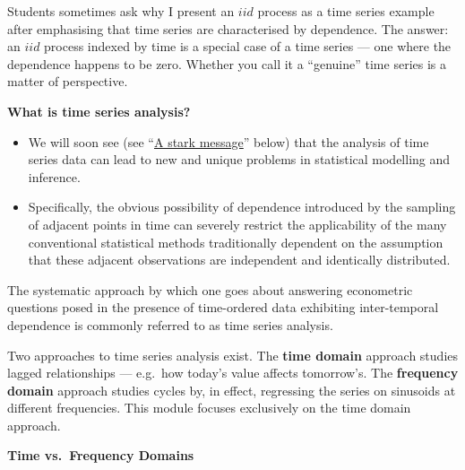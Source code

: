 \documentclass[
  letterpaper,
  DIV=11,
  numbers=noendperiod]{scrartcl}
\newcommand{\slidelabel}[1]{{\color{embernavy}\bfseries\large #1\par\vspace{5pt}}}
\newenvironment{slidefooter}{%
  \par\vspace{7pt}{\color{emberrule}\rule{\linewidth}{0.4pt}}\par\vspace{4pt}%
  \color{emberamber}\itshape\small}{\par}
\begin{document}
Students sometimes ask why I present an \(iid\) process as a time series
example after emphasising that time series are characterised by
dependence. The answer: an \(iid\) process indexed by time is a special
case of a time series --- one where the dependence happens to be zero.
Whether you call it a ``genuine'' time series is a matter of
perspective.

\begin{slidebox}

\slidelabel{What is time series analysis?}

\begin{itemize}
\item
  We will soon see (see ``\hyperref[a-stark-message]{A stark message}''
  below) that the analysis of time series data can lead to new and
  unique problems in statistical modelling and inference.
\item
  Specifically, the obvious possibility of dependence introduced by the
  sampling of adjacent points in time can severely restrict the
  applicability of the many conventional statistical methods
  traditionally dependent on the assumption that these adjacent
  observations are independent and identically distributed.
\end{itemize}

\begin{slidefooter}

The systematic approach by which one goes about answering econometric
questions posed in the presence of time-ordered data exhibiting
inter-temporal dependence is commonly referred to as time series
analysis.

\end{slidefooter}

\end{slidebox}

Two approaches to time series analysis exist. The \textbf{time domain}
approach studies lagged relationships --- e.g.~how today's value affects
tomorrow's. The \textbf{frequency domain} approach studies cycles by, in
effect, regressing the series on sinusoids at different frequencies.
This module focuses exclusively on the time domain approach.

\begin{tcolorbox}[enhanced jigsaw, arc=.35mm, bottomrule=.15mm, bottomtitle=1mm, breakable, colback=white, colbacktitle=quarto-callout-note-color!10!white, colframe=quarto-callout-note-color-frame, coltitle=black, left=2mm, leftrule=.75mm, opacityback=0, opacitybacktitle=0.6, rightrule=.15mm, title=\textcolor{quarto-callout-note-color}{\faInfo}\hspace{0.5em}{Watch: Illustration}, titlerule=0mm, toprule=.15mm, toptitle=1mm]

\textbf{Time vs.~Frequency Domains}

\end{tcolorbox}
\end{document}
